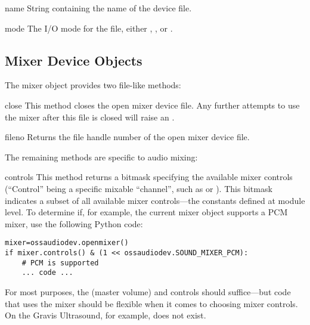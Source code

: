 \begin{memberdesc}{name}{}
String containing the name of the device file.
\end{memberdesc}

\begin{memberdesc}{mode}{}
The I/O mode for the file, either , , or .
\end{memberdesc}


\subsection{Mixer Device Objects \label{mixer-device-objects}}

The mixer object provides two file-like methods:

\begin{methoddesc}{close}{}
This method closes the open mixer device file.  Any further attempts to
use the mixer after this file is closed will raise an .
\end{methoddesc}

\begin{methoddesc}{fileno}{}
Returns the file handle number of the open mixer device file.
\end{methoddesc}

The remaining methods are specific to audio mixing:

\begin{methoddesc}{controls}{}
This method returns a bitmask specifying the available mixer controls
(``Control'' being a specific mixable ``channel'', such as
 or ).  This
bitmask indicates a subset of all available mixer controls---the
 constants defined at module level.  To determine if,
for example, the current mixer object supports a PCM mixer, use the
following Python code:

\begin{verbatim}
mixer=ossaudiodev.openmixer()
if mixer.controls() & (1 << ossaudiodev.SOUND_MIXER_PCM):
    # PCM is supported
    ... code ...
\end{verbatim}

For most purposes, the  (master volume) and
 controls should suffice---but code that uses the
mixer should be flexible when it comes to choosing mixer controls.  On
the Gravis Ultrasound, for example,  does not
exist.
\end{methoddesc}

